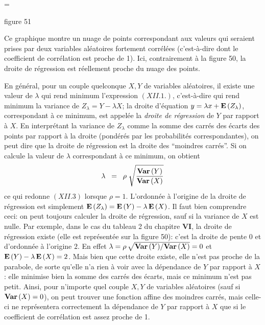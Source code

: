 \midinsert 
\epsfxsize=\hsize
{} 
\vskip2mm 
\centerline{\eightpoint figure 51} 
\vskip8pt 
\centerline{\vbox{\hsize=11cm\eightpoint
Ce graphique montre un nuage de points correspondant aux valeurs qui 
seraient prises par deux variables al\'eatoires fortement corr\'el\'ees 
(c'est-\`a-dire dont le coefficient de corr\'elation est proche de 1). 
Ici, contrairement \`a la figure 50, la droite de r\'egression est 
r\'eellement proche du nuage des points. } } 
\vskip 3mm 
\endinsert 
 
En g\'en\'eral, pour un couple quelconque $X,Y$ de variables al\'eatoires, 
il existe une valeur de $\lambda$ qui rend minimum l'expression 
$(XII.1.)$, c'est-\`a-dire qui rend minimum la variance de $Z_\lambda = 
Y - \lambda X$; la droite d'\'equation $y = \lambda x + {\bf E}\, 
(Z_\lambda )$, correspondant \`a ce minimum, est appel\'ee la {\it
droite de r\'egression} de $Y$ par rapport \`a $X$. En interpr\'etant la 
variance de $Z_\lambda$ comme la somme des carr\'es des \'ecarts 
des points par rapport \`a la droite (pond\'er\'es par les probabilit\'es 
correspondantes), on peut dire que la droite de r\'egression est la 
droite des ``moindres carr\'es''. Si on calcule la valeur de $\lambda$ 
correspondant \`a ce minimum, on obtient
$$\lambda \;\; = \;\; \rho\;\sqrt{{\bf Var}\, (Y) \over {\bf Var}\, (X)}$$
ce qui redonne $(XII.3)$ lorsque $\rho = 1$. L'ordonn\'ee \`a l'origine de
la droite de r\'egression est simplement ${\bf E}\, (Z_\lambda ) = {\bf E}\,
(Y) - \lambda\, {\bf E}\, (X)$. 
\medskip 
Il faut bien comprendre ceci: on peut toujours calculer la droite de 
r\'egression, sauf si la variance de $X$ est nulle. Par exemple, dans le 
cas du tableau 2 du chapitre {\bf VI}, la droite de r\'egression existe 
(elle est repr\'esent\'ee sur la figure 50): c'est la droite de pente $0$
et d'ordonn\'ee \`a l'origine $2$. En effet $\lambda = \rho\,\sqrt{{\bf
Var} \, (Y) / {\bf Var}\, (X)} = 0$ et ${\bf E}\, (Y) - \lambda\, {\bf E}\, 
(X) = 2$. Mais bien que cette droite existe, elle n'est pas proche de la 
parabole, de sorte qu'elle n'a rien \`a voir avec la d\'ependance de $Y$ 
par rapport \`a $X$:  elle minimise bien la somme des carr\'es des 
\'ecarts, mais ce minimum n'est pas petit. Ainsi, pour n'importe quel 
couple $X,Y$ de variables al\'eatoires (sauf si ${\bf Var}\, (X) = 0$), on 
peut trouver une fonction affine des moindres carr\'es, mais celle-ci
ne repr\'esentera correctement la d\'ependance de $Y$ par rapport \`a 
$X$ que si le coefficient de corr\'elation est assez proche de 1. 
\medskip 
